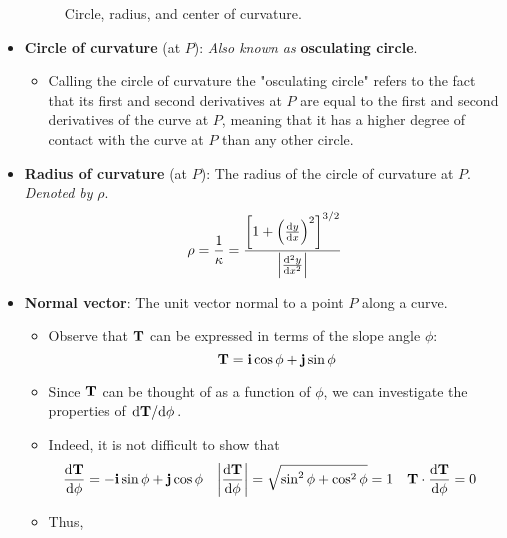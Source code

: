 \documentclass[../main.tex]{subfiles}
\begin{document}
\begin{itemize}
\begin{figure}[h!]
        \caption{Circle, radius, and center of curvature.}
        \label{fig:circleCurvature}
    \end{figure}
    \item \textbf{Circle of curvature} (at $P$):  \emph{Also known as} \textbf{osculating circle}.
    \begin{itemize}
        \item Calling the circle of curvature the "osculating circle" refers to the fact that its first and second derivatives at $P$ are equal to the first and second derivatives of the curve at $P$, meaning that it has a higher degree of contact with the curve at $P$ than any other circle.
    \end{itemize}
    \item \textbf{Radius of curvature} (at $P$): The radius of the circle of curvature at $P$. \emph{Denoted by} $\rho$.
    \begin{equation*}
        \rho = \frac{1}{\kappa}
        = \frac{\left[ 1+\left( \dv{y}{x} \right)^2 \right]^{3/2}}{\left| \dv[2]{y}{x} \right|}
    \end{equation*}
    \item \textbf{Normal vector}: The unit vector normal to a point $P$ along a curve.
    \begin{itemize}
        \item Observe that $\vb{T}$ can be expressed in terms of the slope angle $\phi$:
        \begin{equation*}
            \vb{T} = \vb{i}\cos\phi+\vb{j}\sin\phi
        \end{equation*}
        \item Since $\vb{T}$ can be thought of as a function of $\phi$, we can investigate the properties of $\dv*{\vb{T}}{\phi}$.
        \item Indeed, it is not difficult to show that
        \begin{align*}
            \dv{\vb{T}}{\phi} &= -\vb{i}\sin\phi+\vb{j}\cos\phi&
                \left| \dv{\vb{T}}{\phi} \right| &= \sqrt{\sin^2\phi+\cos^2\phi} = 1&
                    \vb{T}\cdot\dv{\vb{T}}{\phi} &= 0
        \end{align*}
        \item Thus,

\end{itemize}
\end{itemize}
\end{document}
